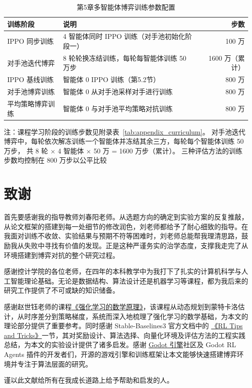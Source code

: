 \documentclass[12pt, a4paper, UTF8]{ctexart}
\numberwithin{equation}{section}
\newcommand{\acknowledgment}[1]{
  \clearpage
  \par\noindent
  \section*{致\quad\quad 谢}
  \addcontentsline{toc}{section}{致\quad\quad 谢}
  #1
}
\begin{document}
\begin{table}[htbp]
  \centering
  \caption{ 第5章多智能体博弈训练参数配置}
  \label{tab:appendix_gameplay_params}
  \begin{tabular}{llr}
    \toprule
    训练阶段 & 说明 & 步数 \\
    \midrule
    IPPO 同步训练 & 4 智能体同时 IPPO 训练（对手池初始化阶段一） & 100 万 \\
    对手池迭代博弈 & 8 轮轮换冻结训练，每轮每智能体训练 50 万步 & 1600 万（累计） \\
    \midrule
    IPPO 基线训练 & 智能体 0 IPPO 训练（第5.2节） & 800 万 \\
    对手池博弈训练 & 智能体 0 从对手池采样对手进行训练 & 800 万 \\
    平均策略博弈训练 & 智能体 0 与对手池平均策略对抗训练 & 800 万 \\
    \bottomrule
  \end{tabular}
  \begin{minipage}{\linewidth}\raggedright
  注：课程学习阶段的训练步数见附录表~\ref{tab:appendix_curriculum}。
  对手池迭代博弈中，每轮依次解冻训练一个智能体并冻结其余三方，每轮每个智能体训练 50 万步，
  共 8 轮 $\times$ 4 智能体 $\times$ 50 万 = 1600 万步（累计）。
  三种评估方法的训练步数均控制在 800 万步以公平比较
  \end{minipage}
  \par
\end{table}
\acknowledgment{
首先要感谢我的指导教师刘春阳老师。从选题方向的确定到实验方案的反复推敲，从论文框架的搭建到每一处细节的修改润色，刘老师都给予了耐心细致的指导。在我面对训练不收敛、实验结果与预期不符等困难时，刘老师总能帮我理清思路，鼓励我从失败中寻找有价值的发现。正是这种严谨务实的治学态度，支撑我走完了从环境搭建到博弈对抗的整个研究过程。

感谢控计学院的各位老师，在四年的本科教学中为我打下了扎实的计算机科学与人工智能理论基础。无论是数据结构、算法设计还是机器学习等课程，都为我后来的研究工作提供了不可或缺的知识储备。

感谢赵世钰老师的课程\href{https://www.bilibili.com/video/BV1sd4y167NS/}{《强化学习的数学原理》}，该课程从动态规划到蒙特卡洛估计，从时序差分到策略梯度，系统而深入地梳理了强化学习的数学基础，为本文的理论部分提供了重要参考。同时感谢 Stable-Baselines3 官方文档中的 \href{https://stable-baselines3.readthedocs.io/en/master/guide/rl_tips.html}{《RL Tips and Tricks》}一节，其对奖励设计、算法选择、向量化环境及评估方法的工程实践总结，为本文的实验设计提供了诸多启发。感谢 \href{https://godotengine.org/}{Godot 引擎}社区及 Godot RL Agents 插件的开发者们，开源的游戏引擎和训练框架让本文能够快速搭建博弈环境并专注于算法层面的研究。

谨以此文献给所有在我成长道路上给予帮助和启发的人。
}
\end{document}
